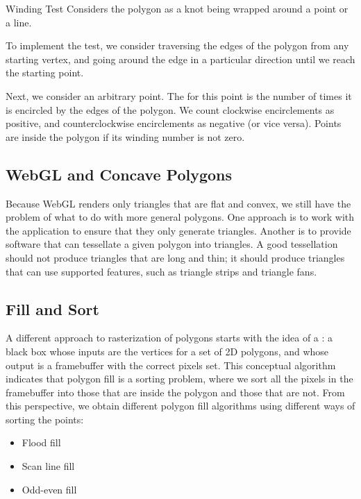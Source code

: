 \documentclass[../COS3712_Notes.tex]{subfiles}
\begin{document}
        \begin{definition}{Winding Test}
          Considers the polygon as a knot being wrapped around a point or a line.

          To implement the test, we consider traversing the edges of the polygon from any
          starting vertex, and going around the edge in a particular direction until we
          reach the starting point.

          Next, we consider an arbitrary point.
          The  for this point is the number of times it is encircled
          by the edges of the polygon.
          We count clockwise encirclements as positive, and counterclockwise encirclements
          as negative (or vice versa).
          Points are inside the polygon if its winding number is not zero.
        \end{definition}

      \subsection{WebGL and Concave Polygons}
        Because WebGL renders only triangles that are flat and convex,
        we still have the problem of what to do with more general polygons.
        One approach is to work with the application to ensure that they only generate triangles.
        Another is to provide software that can tessellate a given polygon into triangles.
        A good tessellation should not produce triangles that are long and thin;
        it should produce triangles that can use supported features, such as triangle strips
        and triangle fans.

      \subsection{Fill and Sort}
        A different approach to rasterization of polygons starts with the idea of a
        : a black box whose inputs are the vertices
        for a set of 2D polygons, and whose output is a framebuffer with the correct pixels set.
        This conceptual algorithm indicates that polygon fill is a sorting problem,
        where we sort all the pixels in the framebuffer into those that are inside the polygon
        and those that are not.
        From this perspective, we obtain different polygon fill algorithms using different ways
        of sorting the points:
        \begin{itemize}[nosep]
          \item Flood fill
          \item Scan line fill
          \item Odd-even fill
        \end{itemize}
\end{document}
